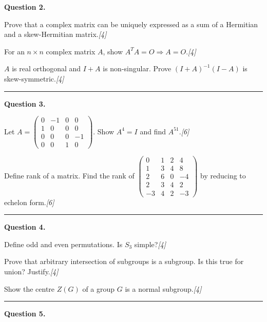 \documentclass[11pt,a4paper]{article}
\newcommand{\pts}[1]{\hfill   \textit{[#1]}}
\begin{document}
\medskip


\noindent   \textbf{Question 2.}

\begin{parts}
  \item Prove that a complex matrix can be uniquely expressed as a sum of a Hermitian and a skew-Hermitian matrix.\pts{4}
  \item For an $n \times n$ complex matrix $A$, show $A^TA=O\Rightarrow A=O$.\pts{4}
  \item $A$ is real orthogonal and $I+A$ is non-singular. Prove $(I+A)^{-1}(I-A)$ is skew-symmetric.\pts{4}
\end{parts}
\medskip\rule{\linewidth}{0.2pt}

\medskip


\noindent   \textbf{Question 3.}

\begin{parts}
  \item Let $A=
\begin{pmatrix}0&-1&0&0\\1&0&0&0\\0&0&0&-1\\0&0&1&0\end{pmatrix}$. Show $A^4=I$ and find $A^{51}$.\pts{6}
  \item Define rank of a matrix. Find the rank of $
\begin{pmatrix}0&1&2&4\\1&3&4&8\\2&6&0&-4\\2&3&4&2\\-3&4&2&-3\end{pmatrix}$ by reducing to echelon form.\pts{6}
\end{parts}
\medskip\rule{\linewidth}{0.2pt}

\medskip


\noindent   \textbf{Question 4.}

\begin{parts}
  \item Define odd and even permutations. Is $S_3$ simple?\pts{4}
  \item Prove that arbitrary intersection of subgroups is a subgroup. Is this true for union? Justify.\pts{4}
  \item Show the centre $Z(G)$ of a group $G$ is a normal subgroup.\pts{4}
\end{parts}
\medskip\rule{\linewidth}{0.2pt}

\medskip


\noindent   \textbf{Question 5.}
\end{document}
